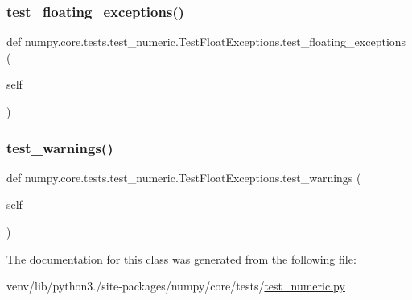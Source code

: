 \subsubsection{\texorpdfstring{test\+\_\+floating\+\_\+exceptions()}{test\_floating\_exceptions()}}
{\footnotesize\ttfamily def numpy.\+core.\+tests.\+test\+\_\+numeric.\+Test\+Float\+Exceptions.\+test\+\_\+floating\+\_\+exceptions (\begin{DoxyParamCaption}\item[{}]{self }\end{DoxyParamCaption})}

\mbox{\label{classnumpy_1_1core_1_1tests_1_1test__numeric_1_1TestFloatExceptions_a5f0613aed29988977d6f66643349c166}} 
\subsubsection{\texorpdfstring{test\+\_\+warnings()}{test\_warnings()}}
{\footnotesize\ttfamily def numpy.\+core.\+tests.\+test\+\_\+numeric.\+Test\+Float\+Exceptions.\+test\+\_\+warnings (\begin{DoxyParamCaption}\item[{}]{self }\end{DoxyParamCaption})}



The documentation for this class was generated from the following file\+:\begin{DoxyCompactItemize}
\item 
venv/lib/python3./site-\/packages/numpy/core/tests/\hyperlink{core_2tests_2test__numeric_8py}{test\+\_\+numeric.\+py}\end{DoxyCompactItemize}
